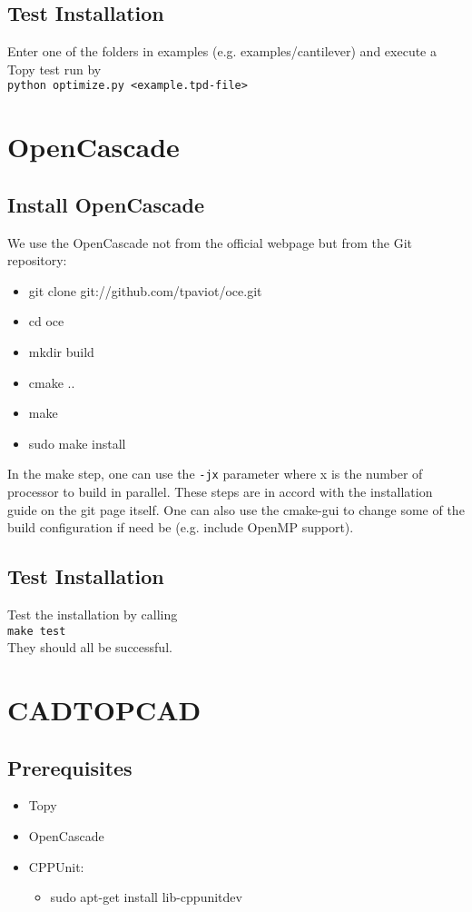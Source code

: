 \documentclass[11pt,a4paper,bibtotoc,idxtotoc,headsepline,footsepline,footexclude,DIV13,oneside]{scrbook}
\begin{document}
	\section{Test Installation}
	Enter one of the folders in examples (e.g. examples/cantilever) and execute a Topy test run by \\
	\texttt{python optimize.py <example.tpd-file>}\\
	
	\chapter{OpenCascade}
	\section{Install OpenCascade}
	We use the OpenCascade not from the official webpage but from the Git repository:
	\begin{itemize}
	\item git clone git://github.com/tpaviot/oce.git
	\item cd oce
	\item mkdir build
	\item cmake ..
	\item make 
	\item sudo make install
	\end{itemize}
	In the make step, one can use the \texttt{-jx} parameter where x is the number of processor to build in parallel. These steps are in accord with the installation guide on the git page itself. One can also use the cmake-gui to change some of the build configuration if need be (e.g. include OpenMP support).
	\section{Test Installation}
	Test the installation by calling \\
	\texttt{make test}\\
	They should all be successful.
	
	\chapter{CADTOPCAD}
	\section{Prerequisites}
	\begin{itemize}
	\item Topy
	\item OpenCascade
	\item CPPUnit:
		\begin{itemize}
		\item sudo apt-get install lib-cppunitdev
		\end{itemize}
	\end{itemize}

  	\clearemptydoublepage
	
 
\end{document}
